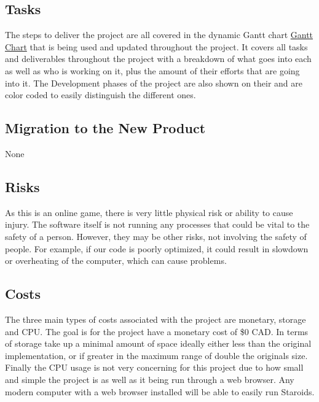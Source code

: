 \documentclass[12pt, titlepage]{article}
\begin{document}
\subsection{Tasks}
The steps to deliver the project are all covered in the dynamic Gantt chart \href{https://gitlab.cas.mcmaster.ca/nagyj2/Staroids/tree/master/ProjectSchedule/StaroidsGantt.pdf}{Gantt Chart} that is being used and updated throughout the project. It covers all tasks and deliverables throughout the project with a breakdown of what goes into each as well as who is working on it, plus the amount of their efforts that are going into it. The Development phases of the project are also shown on their and are color coded to easily distinguish the different ones.\\

\subsection{Migration to the New Product}
None

\subsection{Risks}
As this is an online game, there is very little physical risk or ability to cause injury. The software itself is not running any processes that could be vital to the safety of a person. However, they may be other risks, not involving the safety of people. For example, if our code is poorly optimized, it could result in slowdown or overheating of the computer, which can cause problems.\\

\subsection{Costs}
The three main types of costs associated with the project are monetary, storage and CPU. The goal is for the project have a monetary cost of \$0 CAD. In terms of storage take up a minimal amount of space ideally either less than the original implementation, or if greater in the maximum range of double the originals size. Finally the CPU usage is not very concerning for this project due to how small and simple the project is as well as it being run through a web browser. Any modern computer with a web browser installed will be able to easily run Staroids.\\
\end{document}
